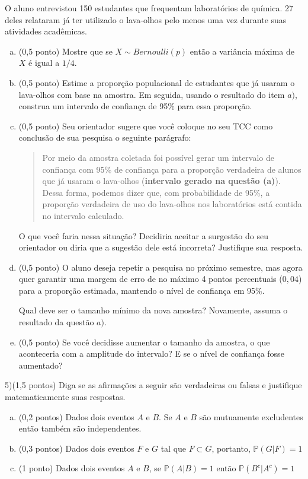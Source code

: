 \documentclass[12pt]{article}
\begin{document}
O aluno entrevistou 150 estudantes que frequentam laboratórios de química. 27 deles relataram já ter utilizado o lava-olhos pelo menos uma vez durante suas atividades acadêmicas.

\begin{enumerate}[a)]
\item (0,5 ponto) Mostre que se $X \sim Bernoulli(p)$ então a variância máxima de $X$ é igual a $1/4$.

\item(0,5 ponto)  Estime a proporção populacional de estudantes que já usaram o lava-olhos com base na amostra.
 Em seguida, usando o resultado do item $a)$, construa um intervalo de confiança de 95\% para essa proporção.

\item (0,5 ponto) Seu orientador sugere que você coloque no seu TCC como conclusão de sua pesquisa o seguinte parágrafo:

\begin{quote}
    Por meio da amostra coletada foi possível gerar um intervalo de confiança com 95\% de confiança para a proporção verdadeira de alunos que já usaram o lava-olhos (\textbf{intervalo gerado na questão (a)}). Dessa forma, 
    podemos dizer que, com probabilidade de 95\%, a proporção verdadeira de uso do lava-olhos nos laboratórios está contida no intervalo calculado. 
\end{quote}

O que você faria nessa situação? Decidiria aceitar a surgestão do seu orientador ou diria que a sugestão dele está incorreta? Justifique sua resposta. 


\item (0,5 ponto)  O aluno deseja repetir a pesquisa no próximo semestre, mas agora quer garantir uma margem de erro de no máximo 4 pontos percentuais (\(0{,}04\)) para a proporção estimada, mantendo o nível de confiança em 95\%.

Qual deve ser o tamanho mínimo da nova amostra? Novamente, assuma o resultado da questão $a)$.


\item (0,5 ponto) Se você decidisse aumentar o tamanho da amostra, o que aconteceria com a amplitude do intervalo? E se o nível de confiança fosse aumentado?

\end{enumerate}

5)(1,5 pontos) Diga se as afirmações a seguir são verdadeiras ou falsas e justifique matematicamente suas respostas. 

\begin{enumerate}[a)]
    \item (0,2 pontos) Dados dois eventos $A$ e $B$. Se $A$ e $B$ são mutuamente excludentes então também são independentes. 
    \item (0,3 pontos) Dados dois eventos $F$ e $G$ tal que $F \subset G$, portanto, $\mathds{P}(G|F) = 1$
    \item (1 ponto) Dados dois eventos $A$ e $B$, se $\mathds{P}(A|B) =1$ então $\mathds{P}(B^c|A^c) =1$
\end{enumerate}
\end{document}
